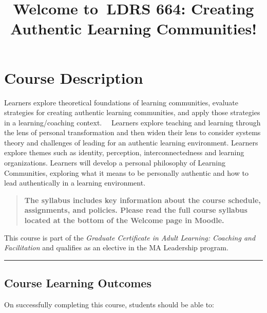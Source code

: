 \documentclass[
]{book}
\title{Welcome to~LDRS 664: Creating Authentic Learning Communities!}
\author{}
\date{\vspace{-2.5em}}
\begin{document}
\maketitle

{
\setcounter{tocdepth}{1}
\tableofcontents
}
\hypertarget{course-description}{%
\chapter*{Course Description}\label{course-description}}

Learners explore theoretical foundations of learning communities, evaluate strategies for creating authentic learning communities, and apply those strategies in a learning/coaching context.~~ Learners explore teaching and learning through the lens of personal transformation and then widen their lens to consider systems theory and challenges of leading for an authentic learning environment. Learners explore themes such as identity, perception, interconnectedness and learning organizations. Learners will develop a personal philosophy of Learning Communities, exploring what it means to be personally authentic and how to lead authentically in a learning environment.~

\begin{quote}
\textbf{The syllabus includes key information about the course schedule, assignments, and policies. Please read the full course syllabus located at the bottom of the Welcome page in Moodle.}
\end{quote}

This course is part of the \emph{Graduate Certificate in Adult Learning: Coaching and Facilitation} and qualifies as an elective in the MA Leadership program.

\begin{center}\rule{0.5\linewidth}{0.5pt}\end{center}

\hypertarget{course-learning-outcomes}{%
\section*{Course Learning Outcomes}\label{course-learning-outcomes}}

On successfully completing this course, students should be able to:
\end{document}
